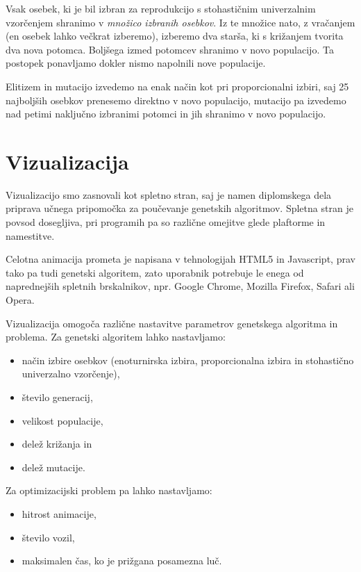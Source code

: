 \documentclass[a4paper, 12pt]{book}
\begin{document}
Vsak osebek, ki je bil izbran za reprodukcijo s stohasti\v cnim univerzalnim vzor\v cenjem shranimo v \textit{mno\v zico izbranih osebkov}. Iz te mno\v zice nato, z vra\v canjem (en osebek lahko ve\v ckrat izberemo), izberemo dva star\v sa, ki s kri\v zanjem tvorita dva nova potomca. Bolj\v sega izmed potomcev shranimo v novo populacijo. Ta postopek ponavljamo dokler nismo napolnili nove populacije.

Elitizem in mutacijo izvedemo na enak na\v cin kot pri proporcionalni izbiri, saj 25 najbolj\v sih osebkov prenesemo direktno v novo populacijo, mutacijo pa izvedemo nad petimi naklju\v cno izbranimi potomci in jih shranimo v novo populacijo.
 
\section{Vizualizacija}
Vizualizacijo smo zasnovali kot spletno stran, saj je namen diplomskega dela priprava u\v cnega pripomo\v cka za pou\v cevanje genetskih algoritmov. Spletna stran je povsod dosegljiva, pri programih pa so razli\v cne omejitve glede plaftorme in namestitve. 

Celotna animacija prometa je napisana v tehnologijah HTML5 in Javascript, prav tako pa tudi genetski algoritem, zato uporabnik potrebuje le enega od naprednej\v sih spletnih brskalnikov, npr. Google Chrome, Mozilla Firefox, Safari ali Opera.

Vizualizacija omogo\v ca razli\v cne nastavitve parametrov genetskega algoritma in problema. Za genetski algoritem lahko nastavljamo:

\begin{itemize}
\item na\v cin izbire osebkov (enoturnirska izbira, proporcionalna izbira in stohasti\v cno univerzalno vzor\v cenje),
\item \v stevilo generacij,
\item velikost populacije,
\item dele\v z kri\v zanja in
\item dele\v z mutacije.
\end{itemize}

Za optimizacijski problem pa lahko nastavljamo:

\begin{itemize}
\item hitrost animacije,
\item \v stevilo vozil,
\item maksimalen \v cas, ko je pri\v zgana posamezna lu\v c.
\end{itemize}
\end{document}
